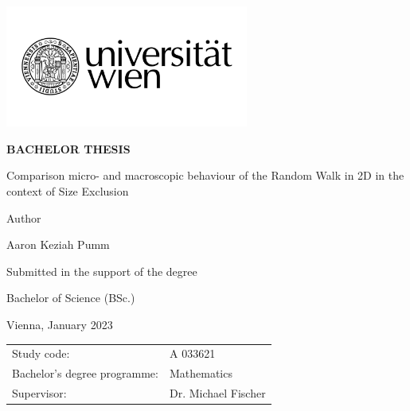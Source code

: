 \begin{titlepage}
\begin{flushright}
    \includegraphics[width=8cm]{Uni_Logo_2016_SW}
\end{flushright}

\begin{center}  %
    \Huge{\textbf{\textsf{\MakeUppercase{
         Bachelor Thesis
    }}}}
    \vspace{2cm}

    \large{\textsf{  %
    }}
    \vspace{.1cm}

    \LARGE{\textsf{  Comparison micro- and macroscopic behaviour of the Random Walk in 2D in the context of Size Exclusion
    }}
    \vspace{3cm}

    \large{\textsf{  %
        Author
    }}

    \Large{\textsf{  Aaron Keziah Pumm
    }}
    \vspace{3cm}

    \large{\textsf{
        Submitted in the support of the degree  %
    }}

    \Large{\textsf{  %
        Bachelor of Science (BSc.)
    }}
\end{center}
\vspace{2cm}

\pagestyle{empty}

\noindent\textsf{Vienna, January 2023}  %
\vfill

\noindent\begin{tabular}{@{}ll}
\textsf{Study code:}
&
\textsf{A 033621}  %
\\
\textsf{Bachelor's degree programme:}
&
\textsf{Mathematics}  %
\\
\textsf{Supervisor:}
&
\textsf{Dr. Michael Fischer}  %
\end{tabular}

\end{titlepage}
